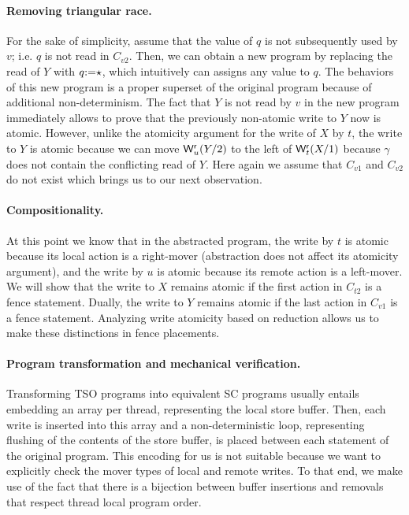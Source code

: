 \documentclass[preprint,9pt]{sigplanconf}
\begin{document}
\paragraph{Removing triangular race.}
For the sake of simplicity, assume that the value of $q$ is not subsequently used by $v$; i.e. $q$ is not read in $C_{v2}$.
Then, we can obtain a new program by replacing the read of $Y$ with $q\mathtt{:=}\star$, which intuitively can assigns any value to $q$.
The behaviors of this new program is a proper superset of the original program because of additional non-determinism. 
The fact that $Y$ is not read by $v$ in the new program immediately allows to prove that the previously non-atomic write to $Y$ now is atomic. 
However, unlike the atomicity argument for the write of $X$ by $t$, the write to $Y$ is atomic because we can move $\mathsf{W}^{\mathsf{r}}_{u}(Y/2)$ to the left of $\mathsf{W}^{\mathsf{r}}_{t}(X/1)$ because $\gamma$ does not contain the conflicting read of $Y$. 
Here again we assume that $C_{v1}$ and $C_{v2}$ do not exist which brings us to our next observation.

\paragraph{Compositionality.}
At this point we know that in the abstracted program, the write by $t$ is atomic because its local action is a right-mover (abstraction does not affect its atomicity argument), and the write by $u$ is atomic because its remote action is a left-mover.
We will show that the write to $X$ remains atomic if the first action in $C_{t2}$ is a fence statement.
Dually, the write to $Y$ remains atomic if the last action in $C_{v1}$ is a fence statement.
Analyzing write atomicity based on reduction allows us to make these distinctions in fence placements.

\paragraph{Program transformation and mechanical verification.}
Transforming TSO programs into equivalent SC programs usually entails embedding an array per thread, representing the local store buffer.
Then, each write is inserted into this array and a non-deterministic loop, representing flushing of the contents of the store buffer, is placed between each statement of the original program.
This encoding for us is not suitable because we want to explicitly check the mover types of local and remote writes. 
To that end, we make use of the fact that there is a bijection between buffer insertions and removals that respect thread local program order.
\end{document}

